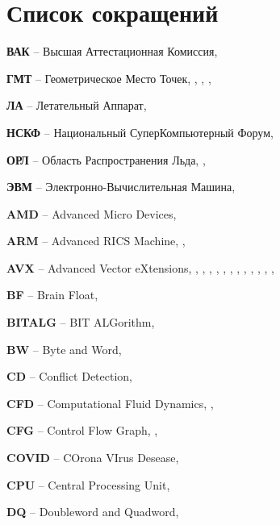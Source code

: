 \newpage

\section*{Список сокращений}

\textbf{ВАК} -- Высшая Аттестационная Комиссия, \pageref{abbr:vak-1}

\textbf{ГМТ} -- Геометрическое Место Точек, \pageref{abbr:gmt-1}, \pageref{abbr:gmt-2}, \pageref{abbr:gmt-3}, \pageref{abbr:gmt-4}

\textbf{ЛА} -- Летательный Аппарат, \pageref{abbr:la-1}

\textbf{НСКФ} -- Национальный СуперКомпьютерный Форум, \pageref{abbr:nscf-1}

\textbf{ОРЛ} -- Область Распространения Льда, \pageref{abbr:orl-1}, \pageref{abbr:orl-2}

\textbf{ЭВМ} -- Электронно-Вычислительная Машина, \pageref{abbr:evm-1}

\textbf{AMD} -- Advanced Micro Devices, \pageref{abbr:amd-1}

\textbf{ARM} -- Advanced RICS\label{abbr:risc-1} Machine, \pageref{abbr:arm-1}, \pageref{abbr:arm-2}

\textbf{AVX} -- Advanced Vector eXtensions, \pageref{abbr:avx-1}, \pageref{abbr:avx-2}, \pageref{abbr:avx-3}, \pageref{abbr:avx-4}, \pageref{abbr:avx-5}, \pageref{abbr:avx-6}, \pageref{abbr:avx-7}, \pageref{abbr:avx-8}, \pageref{abbr:avx-9}, \pageref{abbr:avx-10}, \pageref{abbr:avx-11}, \pageref{abbr:avx-12}, \pageref{abbr:avx-13}

\textbf{BF} -- Brain Float, \pageref{abbr:bf-1}

\textbf{BITALG} -- BIT ALGorithm, \pageref{abbr:bitalg-1}

\textbf{BW} -- Byte and Word, \pageref{abbr:bw-1}

\textbf{CD} -- Conflict Detection, \pageref{abbr:cd-1}

\textbf{CFD} -- Computational Fluid Dynamics, \pageref{abbr:cfd-1}, \pageref{abbr:cfd-2}

\textbf{CFG} -- Control Flow Graph, \pageref{abbr:cfg-1}, \pageref{abbr:cfg-2}

\textbf{COVID} -- COrona VIrus Desease, \pageref{abbr:covid-1}

\textbf{CPU} -- Central Processing Unit, \pageref{abbr:cpu-1}

\textbf{DQ} -- Doubleword and Quadword, \pageref{abbr:dq-1}


